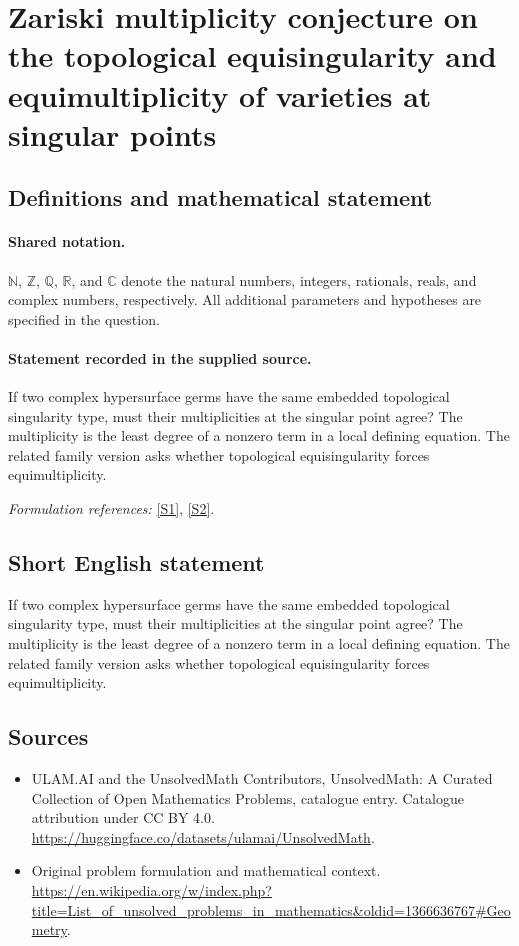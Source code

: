 \documentclass[11pt]{article}
\newcommand{\sref}[2]{\hyperlink{source:#1:#2}{[S#2]}}
\begin{document}
\section{Zariski multiplicity conjecture on the topological equisingularity and equimultiplicity of varieties at singular points}\label{statement}

\subsection{Definitions and mathematical statement}

\paragraph{Shared notation.}$\mathbb N$, $\mathbb Z$, $\mathbb Q$, $\mathbb R$, and $\mathbb C$ denote the natural numbers, integers, rationals, reals, and complex numbers, respectively. All additional parameters and hypotheses are specified in the question.


\paragraph{Statement recorded in the supplied source.}
If two complex hypersurface germs have the same embedded topological singularity type, must their multiplicities at the singular point agree? The multiplicity is the least degree of a nonzero term in a local defining equation. The related family version asks whether topological equisingularity forces equimultiplicity.
\par\smallskip\textit{Formulation references:} \sref{statement}{1}, \sref{statement}{2}.
\subsection{Short English statement}
If two complex hypersurface germs have the same embedded topological singularity type, must their multiplicities at the singular point agree? The multiplicity is the least degree of a nonzero term in a local defining equation. The related family version asks whether topological equisingularity forces equimultiplicity.
\subsection{Sources}
\begin{itemize}
\item[\hypertarget{source:statement:1}{S1}] ULAM.AI and the UnsolvedMath Contributors, UnsolvedMath: A Curated Collection of Open Mathematics Problems, catalogue entry. Catalogue attribution under CC BY 4.0.
\url{https://huggingface.co/datasets/ulamai/UnsolvedMath}.
\item[\hypertarget{source:statement:2}{S2}] Original problem formulation and mathematical context.
\url{https://en.wikipedia.org/w/index.php?title=List_of_unsolved_problems_in_mathematics&oldid=1366636767#Geometry}.
\end{itemize}
\label{end:statement}
\end{document}
